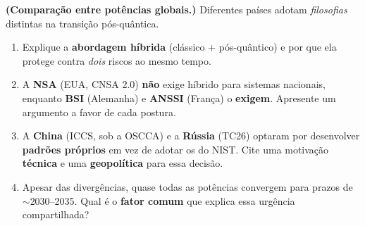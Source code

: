 \documentclass[11pt,a4paper]{article}
\begin{document}
\begin{exercicio}
\textbf{(Compara\c{c}\~{a}o entre pot\^{e}ncias globais.)} Diferentes pa\'{i}ses adotam \emph{filosofias} distintas na transi\c{c}\~{a}o p\'{o}s-qu\^{a}ntica.
\begin{enumerate}[label=(\alph*)]
    \item Explique a \textbf{abordagem h\'{i}brida} (cl\'{a}ssico $+$ p\'{o}s-qu\^{a}ntico) e por que ela protege contra \emph{dois} riscos ao mesmo tempo.
    \item A \textbf{NSA} (EUA, CNSA 2.0) \textbf{n\~{a}o} exige h\'{i}brido para sistemas nacionais, enquanto \textbf{BSI} (Alemanha) e \textbf{ANSSI} (Fran\c{c}a) o \textbf{exigem}. Apresente um argumento a favor de cada postura.
    \item A \textbf{China} (ICCS, sob a OSCCA) e a \textbf{R\'{u}ssia} (TC26) optaram por desenvolver \textbf{padr\~{o}es pr\'{o}prios} em vez de adotar os do NIST. Cite uma motiva\c{c}\~{a}o \textbf{t\'{e}cnica} e uma \textbf{geopol\'{i}tica} para essa decis\~{a}o.
    \item Apesar das diverg\^{e}ncias, quase todas as pot\^{e}ncias convergem para prazos de $\sim$2030--2035. Qual \'{e} o \textbf{fator comum} que explica essa urg\^{e}ncia compartilhada?
\end{enumerate}
\end{exercicio}
\end{document}
